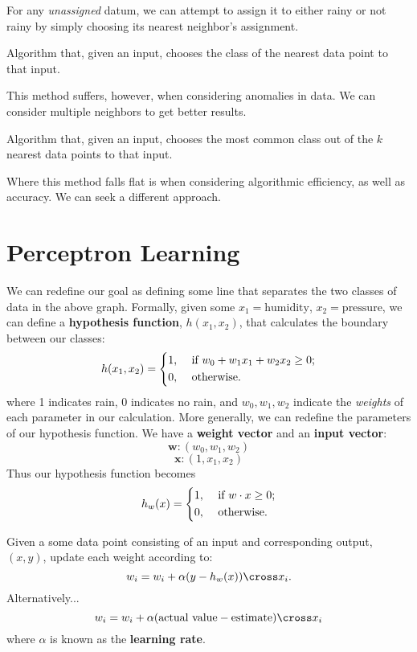 For any \emph{unassigned} datum, we can attempt to assign it to either rainy or not rainy by simply choosing its nearest neighbor's assignment.

\begin{definition}
	Algorithm that, given an input, chooses the class of the nearest data point to that input.
\end{definition}

This method suffers, however, when considering anomalies in data. We can consider multiple neighbors to get better results.

\begin{definition}
	Algorithm that, given an input, chooses the most common class out of the \(k\) nearest data points to that input.
\end{definition}

Where this method falls flat is when considering algorithmic efficiency, as well as accuracy. We can seek a different approach.

\section{Perceptron Learning}
We can redefine our goal as defining some line that separates the two classes of data in the above graph. Formally, given some \(x_1 = \text{humidity}\), \(x_2=\text{pressure} \), we can define a \textbf{hypothesis function}, \(h(x_1, x_2)\), that calculates the boundary between our classes:
\[
	h(x_1,x_2)=\begin{dcases}
		1, &\text{ if } w_0 + w_1 x_1 + w_2 x_2 \geq 0;\\
		0, &\text{ otherwise} .
	\end{dcases}
\]
where 1 indicates rain, 0 indicates no rain, and \(w_0, w_1, w_2\) indicate the \emph{weights} of each parameter in our calculation. More generally, we can redefine the parameters of our hypothesis function. We have a \textbf{weight vector} and an \textbf{input vector}:
\[
	\mathbf{w} : \left( w_0, w_1, w_2 \right) 
\]
\[
	\mathbf{x} : \left( 1, x_1, x_2 \right) 
\]
Thus our hypothesis function becomes
\[
	h_w(x) = \begin{dcases}
		1, &\text{ if } w \cdot x \geq 0;\\
		0, &\text{ otherwise} .
	\end{dcases}
\]

\begin{definition}
	Given a some data point consisting of an input and corresponding output, \((x,y)\), update each weight according to:
	\[
		w_i = w_i + \alpha (y-h_w(x)) \cross x_i.
	\]
	Alternatively...
	\[
		w_i = w_i + \alpha (\text{actual value} - \text{estimate})\cross x_i
	\]
	where \(\alpha \) is known as the \textbf{learning rate}.
\end{definition}

